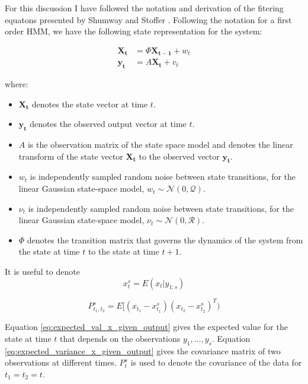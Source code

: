 \documentclass{article}
\begin{document}
For this discussion I have followed the notation and derivation of the fitering equatons presented by Shumway and Stoffer \cite{shumway2006time}. Following the notation for a first order HMM, we have the following state representation for the system:

\begin{equation}\label{eq:hmm_first_order}
  \begin{split}
      \mathbf{X_t} &= \Phi\mathbf{X_{t-1}} + w_t \\
      \mathbf{y_t} &= A\mathbf{X_t} + v_t
  \end{split}
\end{equation}

where:
\begin{itemize}
    \item $\mathbf{X_t}$ denotes the state vector at time $t$.
    \item $\mathbf{y_t}$ denotes the observed output vector at time $t$.
    \item $A$ is the observation matrix of the state space model and denotes the linear transform of the state vector $\mathbf{X_t}$ to the observed vector $\mathbf{y_t}$.
    \item $w_t$ is independently sampled random noise between state transitions, for the linear Gaussian state-space model, $w_t \sim \mathcal{N}(0, \mathcal{Q})$.
    \item $\nu_t$ is independently sampled random noise between state transitions, for the linear Gaussian state-space model, $\nu_t \sim \mathcal{N}(0, \mathcal{R})$.
    \item $\Phi$ denotes the transition matrix that governs the dynamics of the system from the state at time $t$ to the state at time $t+1$.
\end{itemize}

It is useful to denote
\begin{equation}\label{eq:expected_val_x_given_output}
x_t^s = E(x_t \vert y_{1:s})
\end{equation}

\begin{equation}\label{eq:expected_variance_x_given_output}
P_{t_1, t_2}^s = E[(x_{t_1} - x_{t_1}^s)(x_{t_2} - x_{t_2}^s)^T)
\end{equation}

Equation \ref{eq:expected_val_x_given_output} gives the expected value for the state at time $t$ that depends on the observations $y_1, \dots, y_s$. Equation \ref{eq:expected_variance_x_given_output} gives the covariance matrix of two observations at different times. $P_{t}^s$ is used to denote the covariance of the data for $t_1 = t_2 = t$.
\end{document}

